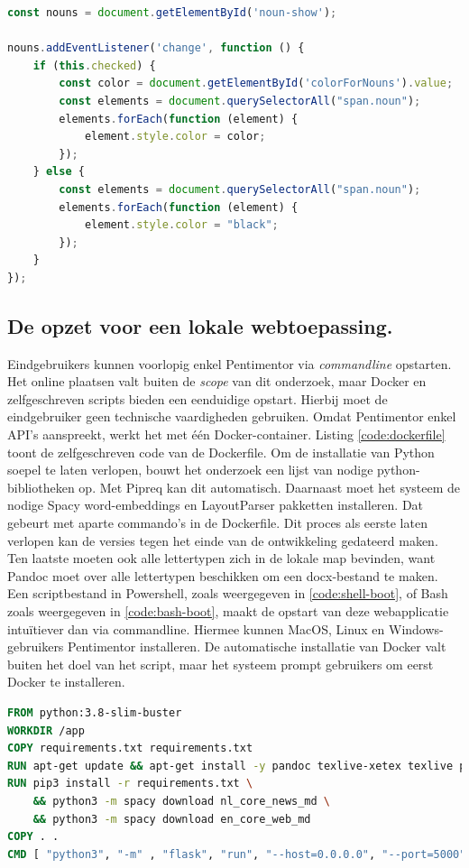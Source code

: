 \begin{lstlisting}[language=javascript, caption={Zelfstandige naamwoorden in het scholierencomponent markeren.}, label={code:frontend-mark-pos-tag}]
const nouns = document.getElementById('noun-show');

nouns.addEventListener('change', function () {
	if (this.checked) {
		const color = document.getElementById('colorForNouns').value;
		const elements = document.querySelectorAll("span.noun");
		elements.forEach(function (element) {
			element.style.color = color;
		});
	} else {
		const elements = document.querySelectorAll("span.noun");
		elements.forEach(function (element) {
			element.style.color = "black";
		});
	}
});
\end{lstlisting}

\subsection{De opzet voor een lokale webtoepassing.}

Eindgebruikers kunnen voorlopig enkel Pentimentor via \textit{commandline} opstarten. Het online plaatsen valt buiten de \textit{scope} van dit onderzoek, maar Docker en zelfgeschreven scripts bieden een eenduidige opstart. Hierbij moet de eindgebruiker geen technische vaardigheden gebruiken. Omdat Pentimentor enkel API's aanspreekt, werkt het met één Docker-container. Listing \ref{code:dockerfile} toont de zelfgeschreven code van de Dockerfile. Om de installatie van Python soepel te laten verlopen, bouwt het onderzoek een lijst van nodige python-bibliotheken op. Met Pipreq kan dit automatisch. Daarnaast moet het systeem de nodige Spacy word-embeddings en LayoutParser pakketten installeren. Dat gebeurt met aparte commando's in de Dockerfile. Dit proces als eerste laten verlopen kan de versies tegen het einde van de ontwikkeling gedateerd maken. Ten laatste moeten ook alle lettertypen zich in de lokale map bevinden, want Pandoc moet over alle lettertypen beschikken om een docx-bestand te maken. Een scriptbestand in Powershell, zoals weergegeven in \ref{code:shell-boot}, of Bash zoals weergegeven in \ref{code:bash-boot}, maakt de opstart van deze webapplicatie intuïtiever dan via commandline. Hiermee kunnen MacOS, Linux en Windows-gebruikers Pentimentor installeren. De automatische installatie van Docker valt buiten het doel van het script, maar het systeem prompt gebruikers om eerst Docker te installeren.

\begin{lstlisting}[language=Dockerfile, caption={Dockerfile voor Pentimentor.}, label={code:dockerfile}]
FROM python:3.8-slim-buster
WORKDIR /app
COPY requirements.txt requirements.txt
RUN apt-get update && apt-get install -y pandoc texlive-xetex texlive poppler-utils
RUN pip3 install -r requirements.txt \
	&& python3 -m spacy download nl_core_news_md \
	&& python3 -m spacy download en_core_web_md
COPY . .	
CMD [ "python3", "-m" , "flask", "run", "--host=0.0.0.0", "--port=5000"]
\end{lstlisting}



